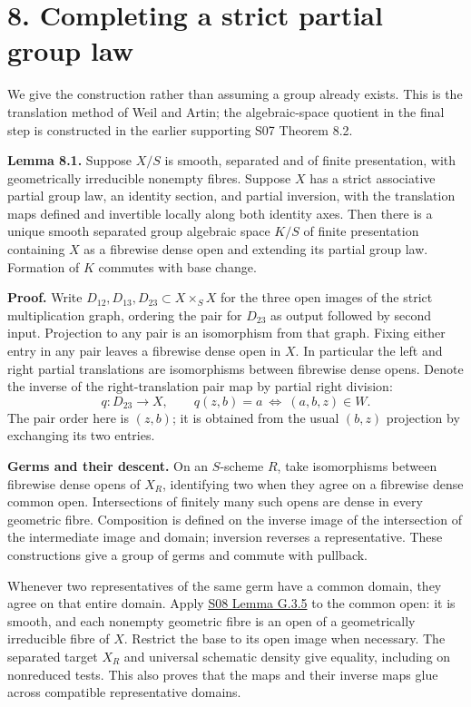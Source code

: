 \documentclass[11pt,a4paper,openany]{report}
\newcounter{none}
\begin{document}
\section{8. Completing a strict partial group law}\label{AG-RG-05-completing-a-strict-partial-group-law}

We give the construction rather than assuming a group already exists. This is the translation method of Weil and Artin; the algebraic-space quotient in the final step is constructed in the earlier supporting S07 Theorem 8.2.

\textbf{Lemma 8.1.} Suppose \(X/S\) is smooth, separated and of finite presentation, with geometrically irreducible nonempty fibres. Suppose \(X\) has a strict associative partial group law, an identity section, and partial inversion, with the translation maps defined and invertible locally along both identity axes. Then there is a unique smooth separated group algebraic space \(K/S\) of finite presentation containing \(X\) as a fibrewise dense open and extending its partial group law. Formation of \(K\) commutes with base change.

\textbf{Proof.} Write \(D_{12},D_{13},D_{23}\subset X\times_SX\) for the three open images of the strict multiplication graph, ordering the pair for \(D_{23}\) as output followed by second input. Projection to any pair is an isomorphism from that graph. Fixing either entry in any pair leaves a fibrewise dense open in \(X\). In particular the left and right partial translations are isomorphisms between fibrewise dense opens. Denote the inverse of the right-translation pair map by partial right division: \[
q:D_{23}\longrightarrow X,\qquad q(z,b)=a\ \Longleftrightarrow\ (a,b,z)\in W.
\] The pair order here is \((z,b)\); it is obtained from the usual \((b,z)\) projection by exchanging its two entries.

\textbf{Germs and their descent.} On an \(S\)-scheme \(R\), take isomorphisms between fibrewise dense opens of \(X_R\), identifying two when they agree on a fibrewise dense common open. Intersections of finitely many such opens are dense in every geometric fibre. Composition is defined on the inverse image of the intersection of the intermediate image and domain; inversion reverses a representative. These constructions give a group of germs and commute with pullback.

Whenever two representatives of the same germ have a common domain, they agree on that entire domain. Apply \href{AG-RG-S08.html\#universal-schematic-density}{S08 Lemma G.3.5} to the common open: it is smooth, and each nonempty geometric fibre is an open of a geometrically irreducible fibre of \(X\). Restrict the base to its open image when necessary. The separated target \(X_R\) and universal schematic density give equality, including on nonreduced tests. This also proves that the maps and their inverse maps glue across compatible representative domains.
\end{document}

